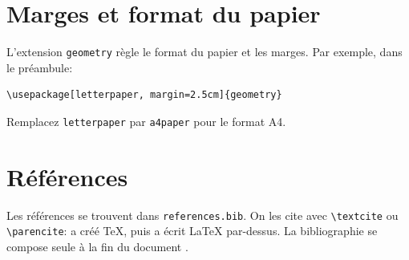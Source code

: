 \documentclass{article}
\begin{document}
\section{Marges et format du papier}

L'extension \texttt{geometry} règle le format du papier et les marges. Par
exemple, dans le préambule:
\begin{verbatim}
\usepackage[letterpaper, margin=2.5cm]{geometry}
\end{verbatim}
Remplacez \texttt{letterpaper} par \texttt{a4paper} pour le format A4.

\section{Références}

Les références se trouvent dans \texttt{references.bib}. On les cite avec
\verb|\textcite| ou \verb|\parencite|: \textcite{knuth1984} a créé \TeX{},
puis \textcite{lamport1994} a écrit \LaTeX{} par-dessus. La bibliographie se
compose seule à la fin du document \parencite{mittelbach2023}.

\printbibliography
\end{document}
